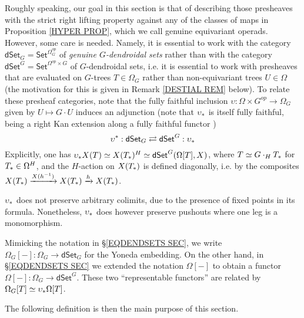 \documentclass[a4paper,10pt
 ,draft
]{article}%
\begin{document}
Roughly speaking, our goal in this section is that of describing those presheaves with the 
strict right lifting property against any of the classes of maps in Proposition \ref{HYPER PROP},
which we call genuine equivariant operads.
However, some care is needed.
Namely, it is essential to work with the category
$\mathsf{dSet}_G = \mathsf{Set}^{\Omega_G^{op}}$
of \textit{genuine $G$-dendroidal sets}
rather than with the category
$\mathsf{dSet}^G = \mathsf{Set}^{\Omega^{op} \times G}$
of $G$-dendroidal sets, i.e. it is essential to work with presheaves that are evaluated on 
$G$-trees $T \in \Omega_G$
rather than non-equivariant trees $U \in \Omega$
(the motivation for this is given in 
Remark \ref{DESTIAL REM} below).
To relate these presheaf categories, note that the fully faithful inclusion
$\upsilon \colon \Omega \times G^{op} \to \Omega_G$
given by $U \mapsto G \cdot U$ induces an adjunction
(note that $\upsilon_{\**}$ is itself fully faithful, being a right Kan extension along a fully faithful functor \cite[Cor. 1.4.5]{Ri14})
\begin{equation}\label{DSETG_EQ}
	\upsilon^{\**}: \dSet_G \rightleftarrows \dSet^G : \upsilon_{\**}
\end{equation}
Explicitly, one has 
$\upsilon_{\**}X(T) \simeq X(T_{\**})^H \simeq
\mathsf{dSet}^G(\Omega[T],X)$,
where $T \simeq G \cdot_H T_{\**}$ for 
$T_{\**} \in \Omega^H$,
and the $H$-action on 
$X(T_{\**})$ is defined diagonally, i.e. by the composites
$X(T_{\**}) \xrightarrow{X(h^{-1})}
X(T_{\**}) \xrightarrow{h} X(T_{\**})$.


\begin{remark}\label{UPSPUSHMON REM}
$\upsilon_{\**}$ does not preserve arbitrary colimits, due to the presence of fixed points in its formula. Nonetheless, $\upsilon_{\**}$ does however preserve pushouts where one leg is a monomorphism.
\end{remark}

\begin{remark}\label{TWOYON REM}
Mimicking the notation in \S \ref{EQDENDSETS SEC},
we write $\Omega_G[-] \colon \Omega_G \to \mathsf{dSet}_G$
for the Yoneda embedding.
On the other hand, in 
\S \ref{EQDENDSETS SEC} we extended the notation $\Omega[-]$
to obtain a functor $\Omega[-] \colon \Omega_G \to \mathsf{dSet}^G$.
These two ``representable functors'' are related by 
$\Omega_G[T] \simeq \upsilon_{\**} \Omega[T]$.
\end{remark}




The following definition is then the main purpose of this section.
\end{document}
